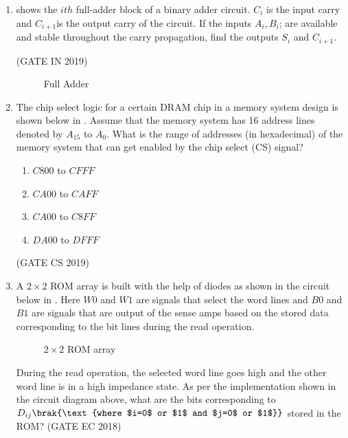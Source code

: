 \begin{enumerate}[label=\arabic*.,ref=\theenumi]
\item 
	shows the $ith$ full-adder block of a binary adder circuit. $C_i$ is the input carry and $C_{i+1}$is the output carry of the circuit.  If the inputs $A_i, B_i$; are available and stable throughout the carry propagation, find the outputs $S_i$ and $C_{i+1}$.

	               \hfill(GATE IN 2019)
\begin{figure}[H] 
    \centering
    \resizebox{0.75\columnwidth}{!}{%
	
	}
	\caption{Full Adder}
	\label{fig:GATE-IN2019,22}
\end{figure}
\item  The chip select logic for a certain DRAM chip in a memory system design is shown below
	in
.
	Assume that the memory system has 16 address lines denoted by ${A_{15}}$ to ${A_0}$. What is the range of addresses (in hexadecimal) of the memory system that can get enabled by the chip select (CS) signal?
\begin{enumerate}
\item ${C800}$ to ${CFFF}$
\item ${CA00}$ to ${CAFF}$
\item ${CA00}$ to ${C8FF}$
\item ${DA00}$ to ${DFFF}$
\end{enumerate}  
\hfill (GATE CS 2019)
%
\begin{figure}[H]

\caption{}
\label{fig:figure14}
\end{figure}
%
\item  A $2\times2$ ROM array is built with the help of diodes as shown in the circuit below
	in . Here $W0$ and $W1$ are signals that select the word lines and $B0$ and $B1$ are signals that are output of the sense amps based on the stored data corresponding to the bit lines during the read operation.
%
\begin{figure}[H]
        \centering
	\resizebox{0.75\columnwidth}{!}{%
        
	}
        \caption{ $2\times 2$ ROM array}
	\label{fig:2rom}
\end{figure}
%
		During the read operation, the selected word line goes high and the other word line is in a high impedance state. As per the implementation shown in the circuit diagram above, what are the bits corresponding to $D_{ij}\brak{\text{where $i=0$ or $1$ and $j=0$ or $1$}}$ stored in the ROM?
	\hfill(GATE EC 2018)
	\begin{multicols}{4}

\end{multicols}
\end{enumerate}
